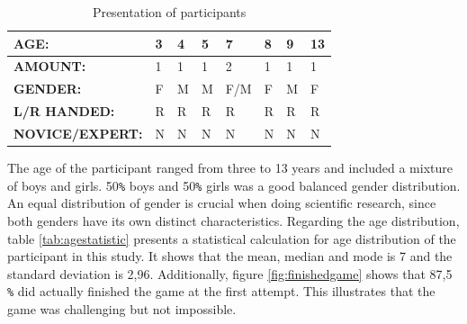 \renewcommand{\arraystretch}{1.5}
 \begin{table}[h]
     \centering
     \begin{tabular}{c|c|c|c|c|c|c|c}
     \hline
        \multicolumn{1}{|l|}{\textbf{AGE:}}  &
        \multicolumn{1}{l|}{3}  &     
        \multicolumn{1}{l|}{4}  & 
        \multicolumn{1}{l|}{5}  & 
        \multicolumn{1}{l|}{7}  & 
        \multicolumn{1}{l|}{8}  & 
        \multicolumn{1}{l|}{9}  & 
        \multicolumn{1}{l|}{13} \\ \hline
        \multicolumn{1}{|l|}{\textbf{AMOUNT:}} &
        \multicolumn{1}{l|}{1}  &
        \multicolumn{1}{l|}{1}  &
        \multicolumn{1}{l|}{1}  &
        \multicolumn{1}{l|}{2}  &
        \multicolumn{1}{l|}{1}  &
        \multicolumn{1}{l|}{1}  &
        \multicolumn{1}{l|}{1}  \\ \hline
        \multicolumn{1}{|l|}{\textbf{GENDER:}}  &
        \multicolumn{1}{|l|}{F} &
        \multicolumn{1}{l|}{M}  &
        \multicolumn{1}{l|}{M}  &
        \multicolumn{1}{l|}{F/M}&
        \multicolumn{1}{l|}{F}  &
        \multicolumn{1}{l|}{M}  &
        \multicolumn{1}{l|}{F}  \\ \hline
        \multicolumn{1}{|l|}{\textbf{L/R HANDED:}} &
        \multicolumn{1}{|l|}{R} &
        \multicolumn{1}{l|}{R}  &
        \multicolumn{1}{l|}{R}  &
        \multicolumn{1}{l|}{R}  &
        \multicolumn{1}{l|}{R}  &
        \multicolumn{1}{l|}{R}  &
        \multicolumn{1}{l|}{R}  \\ \hline
        \multicolumn{1}{|l|}{\textbf{NOVICE/EXPERT:}} &
        \multicolumn{1}{|l|}{N} &
        \multicolumn{1}{l|}{N}  &
        \multicolumn{1}{l|}{N}  &
        \multicolumn{1}{l|}{N}  &
        \multicolumn{1}{l|}{N}  &
        \multicolumn{1}{l|}{N}  &
        \multicolumn{1}{l|}{N}  \\ \hline
     \end{tabular}
     \caption{Presentation of participants}
     \label{tab:participanttable}
 \end{table}
 

The age of the participant ranged from three to 13 years and included a mixture of boys and girls. 50\texttt{\%} boys and 50\texttt{\%} girls was a good balanced gender distribution. An equal distribution of gender is crucial when doing scientific research, since both genders have its own distinct characteristics. Regarding the age distribution, table  \ref{tab:agestatistic} presents a statistical calculation for age distribution of the participant in this study. It shows that the mean, median and mode is 7 and the standard deviation is 2,96.
Additionally, figure \ref{fig:finishedgame} shows that 87,5 \texttt{\%} did actually finished the game at the first attempt. This illustrates that the game was challenging but not impossible. 

